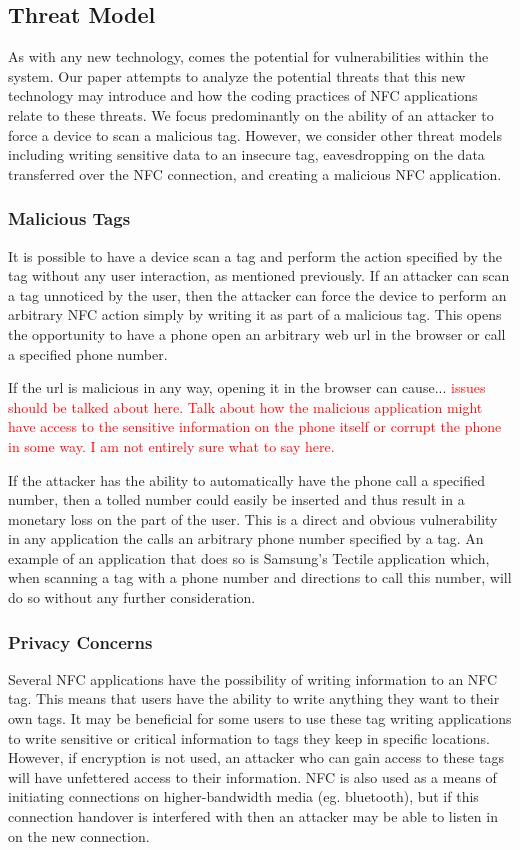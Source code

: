 \documentclass[12pt]{article}
\newcommand\TODO[1]{\textcolor{red}{#1}}
\begin{document}
\subsection{Threat Model}
As with any new technology, comes the potential for vulnerabilities within the system. Our paper attempts to analyze the potential threats that this new technology may introduce and how the coding practices of NFC applications relate to these threats. We focus predominantly on the ability of an attacker to force a device to scan a malicious tag. However, we consider other threat models including writing sensitive data to an insecure tag, eavesdropping on the data transferred over the NFC connection, and creating a malicious NFC application. 

\subsubsection{Malicious Tags}
It is possible to have a device scan a tag and perform the action specified by the tag without any user interaction, as mentioned previously. If an attacker can scan a tag unnoticed by the user, then the attacker can force the device to perform an arbitrary NFC action simply by writing it as part of a malicious tag. This opens the opportunity to have a phone open an arbitrary web url in the browser or call a specified phone number. 

If the url is malicious in any way, opening it in the browser can cause... \TODO{issues should be talked about here. Talk about how the malicious application might have access to the sensitive information on the phone itself or corrupt the phone in some way. I am not entirely sure what to say here.} 

If the attacker has the ability to automatically have the phone call a specified number, then a tolled number could easily be inserted and thus result in a monetary loss on the part of the user. This is a direct and obvious vulnerability in any application the calls an arbitrary phone number specified by a tag. An example of an application that does so is Samsung's Tectile application which, when scanning a tag with a phone number and directions to call this number, will do so without any further consideration. 

\subsubsection{Privacy Concerns}
Several NFC applications have the possibility of writing information to an NFC tag.
This means that users have the ability to write anything they want to their own tags.
It may be beneficial for some users to use these tag writing applications to write sensitive or critical information to tags they keep in specific locations.
However, if encryption is not used, an attacker who can gain access to these tags will have unfettered access to their information.
NFC is also used as a means of initiating connections on higher-bandwidth media (eg. bluetooth), but if this connection handover is interfered with then an attacker may be able to listen in on the new connection.
\end{document}
